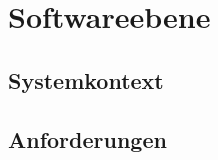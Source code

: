 \section{Softwareebene}\label{sec:softwareebene}


\subsection{Systemkontext}\label{subsec:systemkontext}


\subsection{Anforderungen}\label{subsec:anforderungen}

